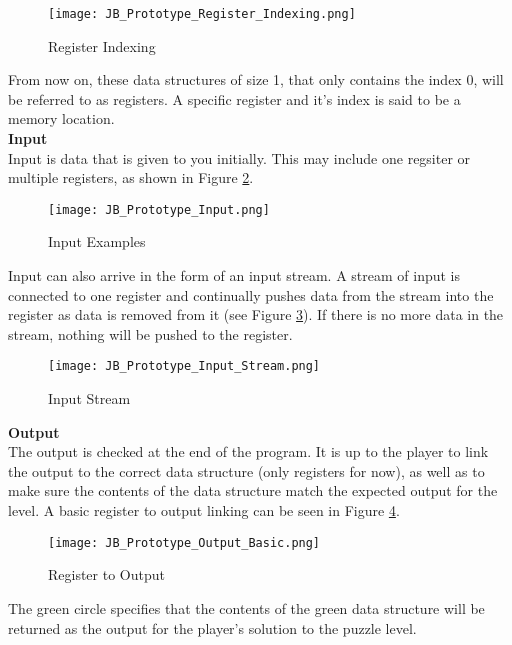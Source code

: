 \begin{figure}[!hb]
  \caption{Register Indexing}
  \label{fig:Register_Indexing}
  \centering
  \texttt{[image: JB\_Prototype\_Register\_Indexing.png]}
\end{figure}

From now on, these data structures of size 1, that only contains the index 0, will
be referred to as registers. A specific register and it's index is said to be a
memory location.\\

\textbf{Input}\\

Input is data that is given to you initially. This may include one regsiter or
multiple registers, as shown in Figure \ref{fig:Input_Example}.

\begin{figure}[!hb]
  \caption{Input Examples}
  \label{fig:Input_Example}
  \centering
  \texttt{[image: JB\_Prototype\_Input.png]}
\end{figure}

Input can also arrive in the form of an input stream. A stream of input is connected
to one register and continually pushes data from the stream into the register as
data is removed from it (see Figure \ref{fig:Input_Stream}). If there is no more data in the stream,
nothing will be pushed to the register.

\begin{figure}[!hb]
  \caption{Input Stream}
  \label{fig:Input_Stream}
  \centering
  \texttt{[image: JB\_Prototype\_Input\_Stream.png]}
\end{figure}
\vfill
\clearpage

\textbf{Output}\\

The output is checked at the end of the program. It is up to the player to link
the output to the correct data structure (only registers for now), as well as to
make sure the contents of the data structure match the expected output for the level.
A basic register to output linking can be seen in Figure \ref{fig:Output_Basic}.

\begin{figure}[!hb]
  \caption{Register to Output}
  \label{fig:Output_Basic}
  \centering
  \texttt{[image: JB\_Prototype\_Output\_Basic.png]}
\end{figure}

The green circle specifies that the contents of the green data structure will be
returned as the output for the player's solution to the puzzle level.\\

